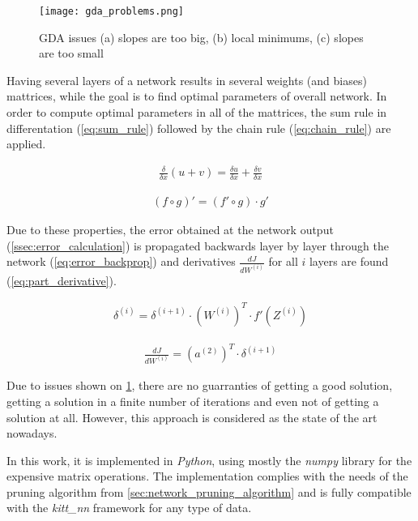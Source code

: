 \begin{figure}[H]
  \centering
  \texttt{[image: gda\_problems.png]}
  \caption{GDA issues \citep{online:nn_demystified} (a) slopes are too big, (b) local minimums, (c) slopes are too small}
  \label{img:gda_problems}
\end{figure}


Having several layers of a network results in several weights (and biases) mattrices, while the goal is to find optimal parameters of overall network. In order to compute optimal parameters in all of the mattrices, the sum rule in differentation (\cref{eq:sum_rule}) followed by the chain rule (\cref{eq:chain_rule}) are applied.

\begin{align} \label{eq:sum_rule}
\frac{\delta}{\delta x} (u+v) = \frac{\delta u}{\delta x} + \frac{\delta v}{\delta x}
\end{align}

\begin{align} \label{eq:chain_rule}
(f \circ g)' = (f' \circ g) \cdot g'
\end{align}

Due to these properties, the error obtained at the network output (\cref{ssec:error_calculation}) is propagated backwards layer by layer through the network (\cref{eq:error_backprop}) and derivatives $ \frac{dJ}{dW^{(i)}} $ for all $ i $ layers are found (\cref{eq:part_derivative}).

\begin{align} \label{eq:error_backprop}
\delta^{(i)} = \delta^{(i+1)} \cdot (W^{(i)})^T \cdot f'(Z^{(i)})
\end{align}

\begin{align} \label{eq:part_derivative}
\frac{dJ}{dW^{(i)}} = (a^{(2)})^T \cdot \delta^{(i+1)}
\end{align}

Due to issues shown on \cref{img:gda_problems}, there are no guarranties of getting a good solution, getting a solution in a finite number of iterations and even not of getting a solution at all. However, this approach is considered as the state of the art nowadays.

In this work, it is implemented in \textit{Python}, using mostly the \textit{numpy} library for the expensive matrix operations. The implementation complies with the needs of the pruning algorithm from \cref{sec:network_pruning_algorithm} and is fully compatible with the \textit{kitt\_nn} framework for any type of data.

